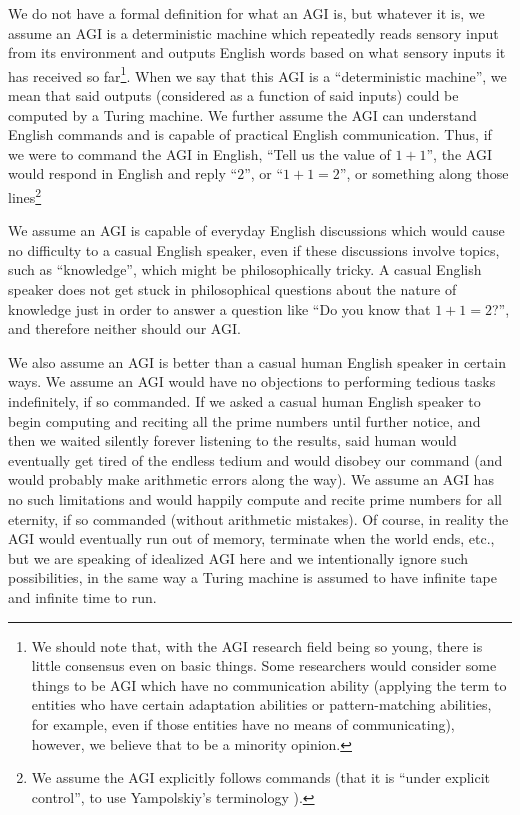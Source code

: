 \documentclass[runningheads]{llncs}
\begin{document}
We do not have a formal definition for what an AGI is, but whatever it is,
we assume an AGI is a deterministic machine
which repeatedly reads sensory input from its environment and outputs
English words based on what sensory inputs it has received so
far\footnote{We should note that, with the AGI research field being so young,
there is little consensus even on basic things. Some researchers would
consider some things to be AGI which have no communication ability (applying the
term to entities who have certain adaptation abilities or
pattern-matching abilities, for example, even if those entities have no
means of communicating), however, we believe that to be a minority opinion.}.
When we say that this AGI is a ``deterministic machine'', we mean that
said outputs (considered as a function of said inputs) could be computed
by a Turing machine. We further assume the AGI can understand English
commands and is capable of practical English communication. Thus, if
we were to command the AGI in English, ``Tell us the value of $1+1$'',
the AGI would respond in English and reply ``$2$'', or ``$1+1=2$'',
or something along those lines\footnote{We assume the AGI explicitly follows
commands (that it is ``under explicit control'', to use Yampolskiy's
terminology \cite{yampolskiycontrol}).}

We assume an AGI is capable of everyday English discussions
which would cause no difficulty to a casual English speaker, even if
these discussions involve topics, such as ``knowledge'', which
might be philosophically tricky. A casual English speaker does not get
stuck in philosophical questions about the nature of knowledge
just in order to answer a question like ``Do you know that $1+1=2$?'',
and therefore neither should our AGI.

We also assume an AGI is better than a casual human English speaker in certain ways.
We assume an AGI would have no objections to performing tedious
tasks indefinitely, if so commanded. If we asked a casual human English speaker to
begin computing and reciting all the prime numbers until further notice, and
then we waited silently forever listening to the results, said human would eventually
get tired of the endless tedium and would disobey our command (and would probably
make arithmetic errors along the way). We assume an AGI
has no such limitations and would happily compute and recite prime numbers for
all eternity, if so commanded (without arithmetic mistakes). Of course,
in reality the AGI would eventually run out of memory, terminate when the world ends,
etc., but we are speaking of idealized AGI here and we
intentionally ignore such possibilities, in the same way a Turing machine is
assumed to have infinite tape and infinite time to run.
\end{document}
